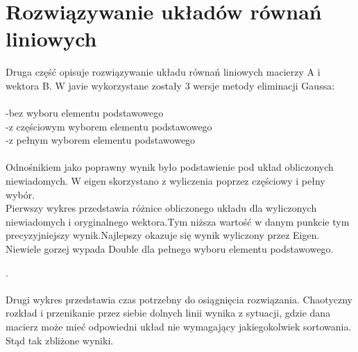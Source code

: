 \documentclass[8pt]{article}
\begin{document}
\section{Rozwiązywanie układów równań liniowych}
Druga część opisuje rozwiązywanie układu równań liniowych macierzy A i wektora B.
W javie wykorzystane zostały 3 wersje metody eliminacji Gaussa:\\
\\
-bez wyboru elementu podstawowego\\
-z częściowym wyborem elementu podstawowego\\
-z pełnym wyborem elementu podstawowego\\
\\
Odnośnikiem jako poprawny wynik było podstawienie pod układ obliczonych niewiadomych. W eigen skorzystano z wyliczenia poprzez częściowy i pełny wybór.\\

Pierwszy wykres przedstawia różnice obliczonego układu dla wyliczonych niewiadomych i oryginalnego wektora.Tym niższa wartość w danym punkcie tym precyzyjniejszy wynik.Najlepszy okazuje się wynik wyliczony przez Eigen. Niewiele gorzej wypada Double dla pełnego wyboru elementu podstawowego.

\begin{center}
\end{center}

.\\
\\Drugi wykres przedstawia czas potrzebny do osiągnięcia rozwiązania. Chaotyczny rozkład i przenikanie przez siebie dolnych linii wynika z sytuacji, gdzie dana macierz może mieć odpowiedni układ nie wymagający jakiegokolwiek sortowania. Stąd tak zbliżone wyniki.\\
\end{document}
